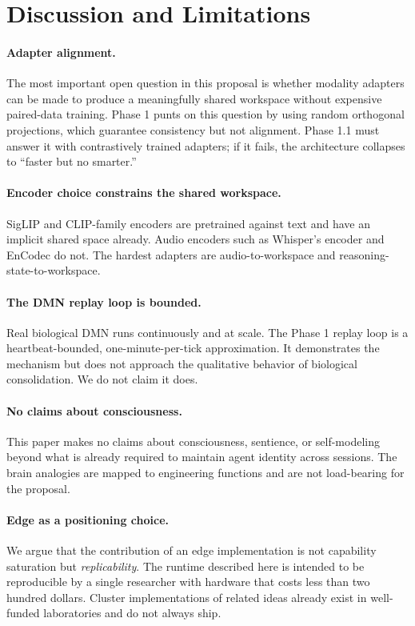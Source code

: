 \documentclass[11pt]{article}
\begin{document}
\section{Discussion and Limitations}
\label{sec:discussion}

\paragraph{Adapter alignment.} The most important open
question in this proposal is whether modality adapters can be
made to produce a meaningfully shared workspace without
expensive paired-data training. Phase 1 punts on this question
by using random orthogonal projections, which guarantee
consistency but not alignment. Phase 1.1 must answer it with
contrastively trained adapters; if it fails, the architecture
collapses to ``faster but no smarter.''

\paragraph{Encoder choice constrains the shared workspace.}
SigLIP and CLIP-family encoders are pretrained against text and
have an implicit shared space already. Audio encoders such as
Whisper's encoder and EnCodec do not. The hardest adapters are
audio-to-workspace and reasoning-state-to-workspace.

\paragraph{The DMN replay loop is bounded.} Real biological DMN
runs continuously and at scale. The Phase 1 replay loop is a
heartbeat-bounded, one-minute-per-tick approximation. It
demonstrates the mechanism but does not approach the
qualitative behavior of biological consolidation. We do not
claim it does.

\paragraph{No claims about consciousness.} This paper makes no
claims about consciousness, sentience, or self-modeling beyond
what is already required to maintain agent identity across
sessions. The brain analogies are mapped to engineering
functions and are not load-bearing for the proposal.

\paragraph{Edge as a positioning choice.} We argue that the
contribution of an edge implementation is not capability
saturation but \emph{replicability}. The runtime described here
is intended to be reproducible by a single researcher with
hardware that costs less than two hundred dollars. Cluster
implementations of related ideas already exist in well-funded
laboratories and do not always ship.
\end{document}

